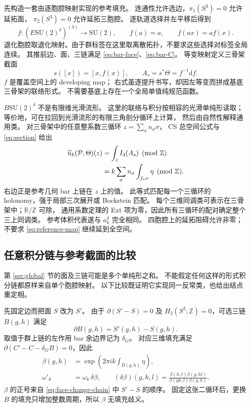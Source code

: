 \documentclass[UTF8,11pt,fontset=none]{ctexart}
\numberwithin{equation}{section}
\theoremstyle{definition}
\newcommand{\R}{\mathbb R}
\newcommand{\Z}{\mathbb Z}
\newcommand{\dd}{\mathrm d}
\newcommand{\SU}{\mathrm{SU}(2)}
\newcommand{\delG}{\delta_G}
\begin{document}
先构造一套由逐胞腔映射实现的参考填充。
连通性允许选边，$\pi_1(S^3)=0$ 允许延拓面，
$\pi_2(S^3)=0$ 允许延拓三胞腔。
逐轨道选择并左平移后得到
\begin{equation}
 f:(E\SU^\delta)^{(3)}\longrightarrow\SU,\qquad
 f(a)=a,\qquad f(ax)=af(x).
 \label{eq:reference-map}
\end{equation}
退化胞腔取退化映射。由于群标签在这里取离散拓扑，不要求这些选择对标签全局连续。
其推前边、面、三链满足 \eqref{eq:bar-face}、\eqref{eq:bar-C}。
等变映射定义三骨架截面
\begin{equation}
 s([x])=[x,f(x)],\qquad A_s=s^*\Theta=f^{-1}\dd f.
 \label{eq:section}
\end{equation}
$f$ 是覆盖空间上的 developing map；
右式虽逐提升书写，却因左等变而拼成基底三骨架的联络形式。
不需要基底上存在一个全局单值纯规范函数。

$B\SU^\delta$ 不是有限维光滑流形。
这里的联络与积分按相容的光滑单纯形读取；
等价地，可在拉回到光滑流形的有限三角剖分循环上计算，
然后由自然性解释通用类。
对三骨架中的任意整系数三循环 $z=\sum_\sigma n_\sigma\sigma$，
CS 总空间公式与 \eqref{eq:section} 给出
\begin{align}
 \widehat u_k(\mathcal P,\Theta)(z)
 &=\int_zI_3(A_s)\pmod{\Z}\notag\\
 &=k\sum_\sigma n_\sigma\int_{f_*\sigma}\eta\pmod{\Z}.
 \label{eq:cycle-equality}
\end{align}
右边正是参考几何 bar 上链在 $z$ 上的值。
此等式匹配每一个三循环的 holonomy，强于局部三次展开或 Bockstein 匹配。
每个三维同调类可表示在三骨架中；$\R/\Z$ 可除，
通用系数定理的 Ext 项为零，因此所有三循环的配对确定整个三上同调类。
参考体积代表遂与 $a_k^\delta$ 完全相同。
四胞腔上的延拓阻碍允许非零；不要求 \eqref{eq:reference-map} 继续延到全空间。

\subsection{任意积分链与参考截面的比较}

第 \ref{sec:global} 节的面及三链可能是多个单纯形之和。
不能假定任何这样的形式积分链都原样来自单个胞腔映射。
以下比较既证明它实现同一反常类，也给出结点重定相。

先固定边而把面 $S$ 改为 $S'$。
由于 $\partial(S'-S)=0$ 及 $H_2(S^3;\Z)=0$，可选三链 $B(g,h)$ 满足
\begin{equation}
 \partial B(g,h)=S'(g,h)-S(g,h).
 \label{eq:face-change-chain}
\end{equation}
取值于群上链的左作用 bar 余边界记为 $\delG$。
对应三维填充满足
$\partial(C'-C-\delG B)=0$，因此
\begin{align}
 \beta(g,h)&=\exp\left(2\pi ik\int_{B(g,h)}\eta\right),\label{eq:beta}\\
 \omega'_k&=\omega_k\,\delta\beta,\qquad
 (\delta\beta)(g,h,l)=
 \frac{\beta(h,l)\beta(g,hl)}{\beta(gh,l)\beta(g,h)}.
 \label{eq:coboundary-change}
\end{align}
$\beta$ 的正号来自 \eqref{eq:face-change-chain} 中 $S'-S$ 的顺序。
固定这张二循环后，更换 $B$ 的填充只增加整数周期，所以 $\beta$ 无填充歧义。
\end{document}
